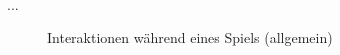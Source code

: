 ~\\
...

	\begin{figure}[ht]
	  \centering
	  
	  \caption{Interaktionen während eines Spiels (allgemein)}
	\end{figure}

%	  

